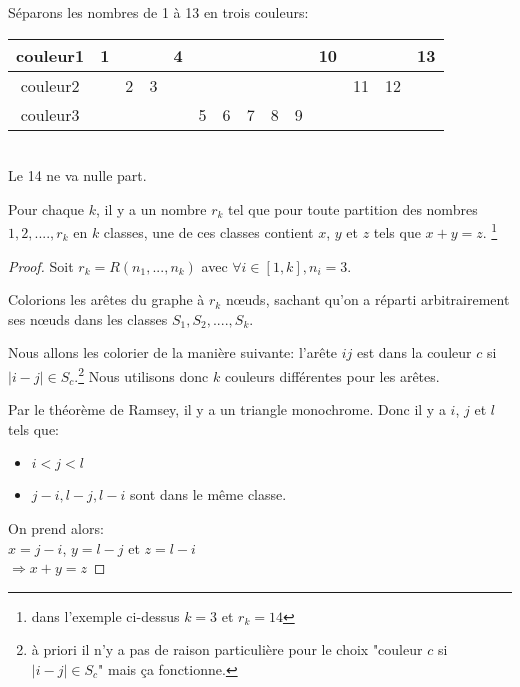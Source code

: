 \begin{myexem}
Séparons les nombres de 1 à 13 en trois couleurs:
\vspace*{0.2cm}

    \begin{tabular}{|c|c|c|c|c|c|c|c|c|c|c|c|c|c|}
        \hline
       couleur1 & 1 &  &  & 4  &  &  &  &  &  & 10 &  &  & 13\\

       \hline
       couleur2 &  & 2 & 3 &  &  &  &  &  &  &  & 11 & 12 &\\

       \hline
       couleur3 &  &  &  &  & 5 & 6 & 7 & 8 & 9 &  &  &  &\\

        \hline
      \end{tabular} \\
      Le 14 ne va nulle part.
\end{myexem}


\begin{mytheo} 
Pour chaque $k$, il y a un nombre $r_k$ tel que pour toute partition des nombres $1,2,....,r_k$ en $k$ classes, une de ces classes contient $x$, $y$ et $z$ tels que $x+y=z$. \footnote{dans l'exemple ci-dessus $k = 3$ et $r_k = 14$}
\begin{proof}
Soit $r_k = R(n_1,...,n_k)$ avec $\forall i \in [1 , k], n_i = 3 $.

Colorions les ar\^etes du graphe à $r_k$ nœuds, sachant qu'on a réparti arbitrairement ses nœuds dans les classes $S_1 ,S_2,....,S_k$.

Nous allons les colorier de la manière suivante: l'ar\^ete $ij$ est dans la couleur $c$ si $\mid i-j \mid \in S_c $.\footnote{à priori il n'y a pas de raison particulière pour le choix "couleur $c$ si $\mid i-j \mid \in S_c $" mais ça fonctionne.} Nous utilisons donc $k$ couleurs différentes pour les arêtes.

Par le théorème de Ramsey, il y a un triangle monochrome.
Donc il y a $i$, $j$ et $l$ tels que:
\begin{itemize}
\item
$i < j < l$
\item
$j-i, l-j, l-i$ sont dans le m\^eme classe.
\end{itemize}

On prend alors:\\
$x = j-i$, $y = l-j$ et $z = l-i$\\
$\Rightarrow x+y=z$

\end{proof}
\end{mytheo}


